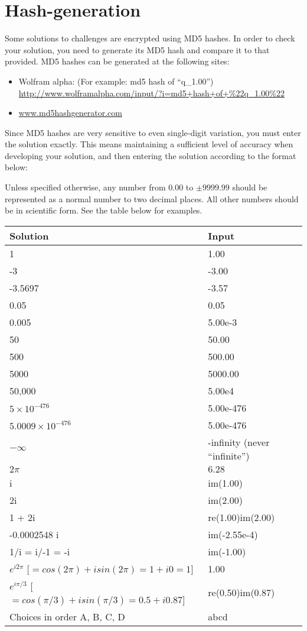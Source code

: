 \newpage
\section{Hash-generation}
\label{sec:hashes}

Some solutions to challenges are encrypted using MD5 hashes. In order to check your solution, you need to generate its MD5 hash and compare it to that provided. MD5 hashes can be generated at the following sites:

\begin{itemize}
    \item Wolfram alpha: (For example: md5 hash of ``q\_1.00'') \url{http://www.wolframalpha.com/input/?i=md5+hash+of+\%22q_1.00\%22}
    \item \url{www.md5hashgenerator.com}
\end{itemize}

Since MD5 hashes are very sensitive to even single-digit variation, you must enter the solution exactly. This means maintaining a sufficient level of accuracy when developing your solution, and then entering the solution according to the format below:

Unless specified otherwise, any number from $0.00$ to $\pm 9999.99$ should be represented as a normal number to two decimal places. All other numbers should be in scientific form. See the table below for examples.

\begin{center}
\begin{tabular}{|l|l|}
    \hline
    \textbf{Solution} & \textbf{Input} \\ \hline
    1 & 1.00 \\
    -3 & -3.00 \\
    -3.5697 & -3.57 \\
    0.05 & 0.05 \\
    0.005 & 5.00e-3 \\
    50 & 50.00 \\
    500 & 500.00 \\
    5000 & 5000.00 \\
    50,000 & 5.00e4 \\
    $5 \times 10^{-476}$ & 5.00e-476 \\
    $5.0009 \times 10^{-476}$ & 5.00e-476 \\
    $-\infty$ & -infinity (never ``infinite'')\\
    $2 \pi$ & $6.28$ \\
    i & im(1.00) \\
    2i & im(2.00) \\
    1 + 2i & re(1.00)im(2.00) \\
    -0.0002548 i & im(-2.55e-4) \\
    1/i = i/-1 = -i & im(-1.00) \\
    $e^{i2\pi}$ [$= cos(2 \pi) + isin(2 \pi) = 1 + i0 = 1$] & 1.00 \\
    $e^{i\pi/3}$ [$= cos(\pi/3) + isin(\pi/3) = 0.5 + i 0.87$] & re(0.50)im(0.87) \\
    Choices in order A, B, C, D & abcd \\
    \hline
\end{tabular}
\end{center}

